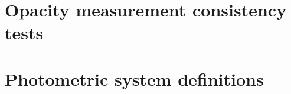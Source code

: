 \documentclass[a4paper, 11pt]{report}
\begin{document}
  \section{Opacity measurement consistency tests}
  \label{ap:opacity}
  
  \clearpage
  
  
  \clearpage
  
  \section{Photometric system definitions}
  \label{ap:cal_HA}
  
  
  

  
  
  \label{ap:cal_JFL}
  \clearpage
  
  
  
  \clearpage
  

  

  

  

\clearpage

%



\end{document}
